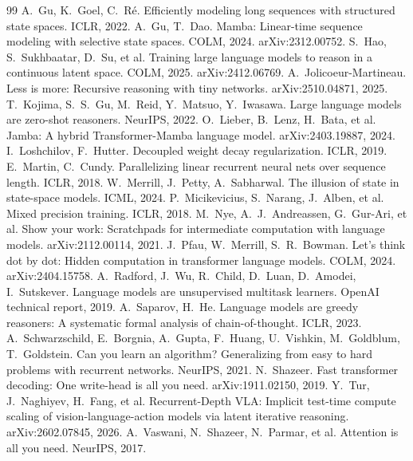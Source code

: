 \documentclass[10pt]{article}
\begin{document}
\begin{thebibliography}{99}
 A.~Gu, K.~Goel, C.~R\'e. Efficiently modeling long sequences with structured state spaces. ICLR, 2022.
 A.~Gu, T.~Dao. Mamba: Linear-time sequence modeling with selective state spaces. COLM, 2024. arXiv:2312.00752.
 S.~Hao, S.~Sukhbaatar, D.~Su, et al. Training large language models to reason in a continuous latent space. COLM, 2025. arXiv:2412.06769.
 A.~Jolicoeur-Martineau. Less is more: Recursive reasoning with tiny networks. arXiv:2510.04871, 2025.
 T.~Kojima, S.~S.~Gu, M.~Reid, Y.~Matsuo, Y.~Iwasawa. Large language models are zero-shot reasoners. NeurIPS, 2022.
 O.~Lieber, B.~Lenz, H.~Bata, et al. Jamba: A hybrid Transformer-Mamba language model. arXiv:2403.19887, 2024.
 I.~Loshchilov, F.~Hutter. Decoupled weight decay regularization. ICLR, 2019.
 E.~Martin, C.~Cundy. Parallelizing linear recurrent neural nets over sequence length. ICLR, 2018.
 W.~Merrill, J.~Petty, A.~Sabharwal. The illusion of state in state-space models. ICML, 2024.
 P.~Micikevicius, S.~Narang, J.~Alben, et al. Mixed precision training. ICLR, 2018.
 M.~Nye, A.~J.~Andreassen, G.~Gur-Ari, et al. Show your work: Scratchpads for intermediate computation with language models. arXiv:2112.00114, 2021.
 J.~Pfau, W.~Merrill, S.~R.~Bowman. Let's think dot by dot: Hidden computation in transformer language models. COLM, 2024. arXiv:2404.15758.
 A.~Radford, J.~Wu, R.~Child, D.~Luan, D.~Amodei, I.~Sutskever. Language models are unsupervised multitask learners. OpenAI technical report, 2019.
 A.~Saparov, H.~He. Language models are greedy reasoners: A systematic formal analysis of chain-of-thought. ICLR, 2023.
 A.~Schwarzschild, E.~Borgnia, A.~Gupta, F.~Huang, U.~Vishkin, M.~Goldblum, T.~Goldstein. Can you learn an algorithm? Generalizing from easy to hard problems with recurrent networks. NeurIPS, 2021.
 N.~Shazeer. Fast transformer decoding: One write-head is all you need. arXiv:1911.02150, 2019.
 Y.~Tur, J.~Naghiyev, H.~Fang, et al. Recurrent-Depth VLA: Implicit test-time compute scaling of vision-language-action models via latent iterative reasoning. arXiv:2602.07845, 2026.
 A.~Vaswani, N.~Shazeer, N.~Parmar, et al. Attention is all you need. NeurIPS, 2017.

\end{thebibliography}
\end{document}
